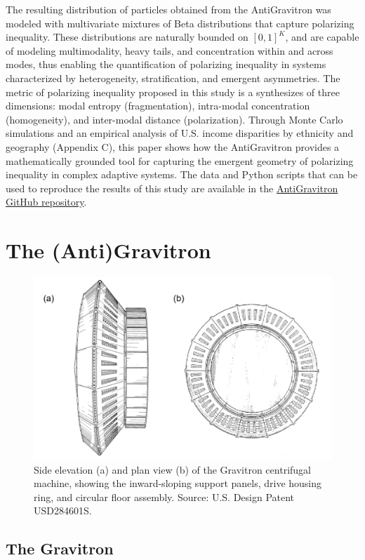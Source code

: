 \documentclass[11pt]{article}
\begin{document}
The resulting distribution of particles obtained from the AntiGravitron was modeled with multivariate mixtures of Beta distributions that capture polarizing inequality. These distributions are naturally bounded on $[0,1]^K$, and are capable of modeling multimodality, heavy tails, and concentration within and across modes, thus enabling the quantification of polarizing inequality in systems characterized by heterogeneity, stratification, and emergent asymmetries. The metric of polarizing inequality proposed in this study is a synthesizes of three dimensions: modal entropy (fragmentation), intra-modal concentration (homogeneity), and inter-modal distance (polarization). Through Monte Carlo simulations and an empirical analysis of U.S. income disparities by ethnicity and geography (Appendix C), this paper shows how the AntiGravitron provides a mathematically grounded tool for capturing the emergent geometry of polarizing inequality in complex adaptive systems. The data and Python scripts that can be used to reproduce the results of this study are available in the \href{https://github.com/rogon666/AntiGravitron}{AntiGravitron GitHub repository}.


\section{The (Anti)Gravitron}

\begin{figure}
    \centering
    \includegraphics[width=0.75\linewidth]{figures/fig_gravitron.png}
    \caption{Side elevation (a) and plan view (b) of the Gravitron centrifugal machine, showing the inward-sloping support panels, drive housing ring, and circular floor assembly. Source: U.S. Design Patent USD284601S.}
    \label{fig:gravitron}
\end{figure}
\subsection{The Gravitron}
\end{document}

